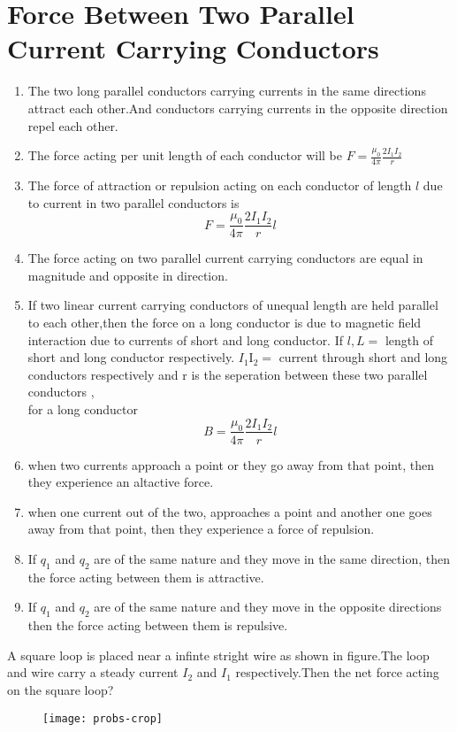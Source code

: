 \section{ Force Between Two Parallel Current Carrying Conductors}
\begin{enumerate}
	\item  The two long parallel conductors carrying currents in the same directions attract each other.And conductors carrying currents in the opposite direction repel each other.
	\item  The force acting per unit length of each conductor will be $F=\frac{\mu_{0}}{4 \pi} \frac{2 I_{1} I_{2}}{r}$
	\item  The force of attraction or repulsion acting on each conductor of length $l$ due to current in two parallel conductors is
	$$
	F=\frac{\mu_{0}}{4 \pi} \frac{2 I_{1} I_{2}}{r} l
	$$
	\item The force acting on two parallel current carrying conductors are equal in magnitude and opposite in direction.
	\item If two linear current carrying conductors of unequal length are held parallel to each other,then the force on a long conductor is due to magnetic field interaction due to currents of short and long conductor. If $l, L=$ length of short and long conductor respectively. $I_{1} \mathrm{I}_{2}=$  current through short and long conductors respectively and r is the seperation between these two parallel conductors ,\\
	for a long conductor$$B=\frac{\mu_{0}}{4\pi}\frac{2I_1I_2}{r}l$$
	\item  when two currents approach a point or they go away from that point, then they experience an altactive force.
	\item when one current out of the two, approaches a point and another one goes away from that point, then they experience a force of repulsion.
	\item If $q_{1}$ and $q_{2}$ are of the same nature and they move in the same direction, then the force acting between them is attractive.
	\item If $q_{1}$ and $q_{2}$ are of the same nature and they move in the opposite directions then the force acting between them is repulsive.
\end{enumerate}
\begin{exercise}
	A square loop is placed near a infinte stright wire as shown in figure.The loop and wire carry a steady current $I_2$ and $I_1$ respectively.Then the net force acting on the square loop?
	\begin{figure}[H]
		\centering
		\texttt{[image: probs-crop]}
	\end{figure}
\end{exercise}
